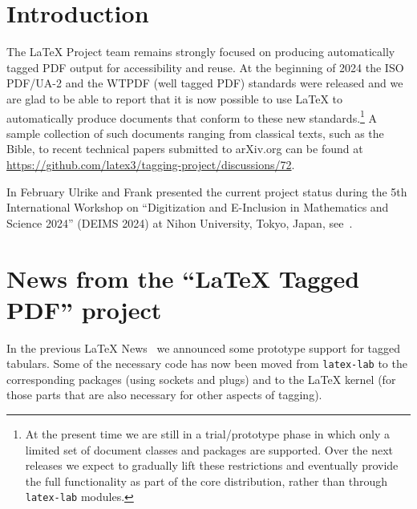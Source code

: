 \documentclass{ltnews}
\providecommand\tubcommand[1]{}
\begin{document}
\tubcommand{\addtolength\textheight{4.2pc}}   %

\maketitle
{  \spaceskip=3.33pt 
\tableofcontents}

\setlength{}

\medskip

\section{Introduction}

The \LaTeX{} Project team remains strongly focused on producing
automatically tagged PDF output for accessibility and reuse. At the
beginning of 2024 the ISO PDF/UA-2 and the WTPDF (well tagged PDF)
standards were released and we are glad to be able to report that it
is now possible to use \LaTeX{} to automatically produce documents
that conform to these new standards.\footnote{At the present time we
are still in a trial/prototype phase in which only a limited set of
document classes and packages are supported.  Over the next releases
we expect to gradually lift these restrictions and eventually provide
the full functionality as part of the core distribution, rather than
through \texttt{latex-lab} modules.}  A sample collection of such
documents ranging from classical texts, such as the Bible, to recent
technical papers submitted to arXiv.org can be found at
\url{https://github.com/latex3/tagging-project/discussions/72}.

In February Ulrike and Frank presented the current project status
during the 5th International Workshop on \enquote{Digitization and
  E-Inclusion in Mathematics and Science 2024} (DEIMS 2024) at Nihon
University, Tokyo, Japan, see~\cite{39:deims}.


\section{News from the \enquote{\LaTeX{} Tagged PDF} project}

In the previous \LaTeX{} News~\cite{39:ltnews38} we announced some prototype
support for tagged tabulars. Some of the necessary code has
now been moved from \texttt{latex-lab} to the corresponding packages
(using sockets and plugs) and to the \LaTeX{} kernel (for those parts
that are also necessary for other aspects of tagging).
\end{document}

